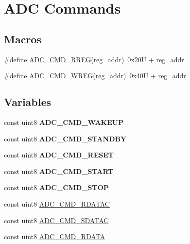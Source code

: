 \hypertarget{group___a_d_c_cmd}{\section{A\-D\-C Commands}
\label{group___a_d_c_cmd}
}
\subsection*{Macros}
\begin{DoxyCompactItemize}
\item 
\#define \hyperlink{group___a_d_c_cmd_ga22bf5b3b8df5ad852238e8f065d66b0f}{A\-D\-C\-\_\-\-C\-M\-D\-\_\-\-R\-R\-E\-G}(reg\-\_\-addr)~0x20\-U + reg\-\_\-addr
\item 
\#define \hyperlink{group___a_d_c_cmd_ga8d377152409009c1afc2e4b815424156}{A\-D\-C\-\_\-\-C\-M\-D\-\_\-\-W\-R\-E\-G}(reg\-\_\-addr)~0x40\-U + reg\-\_\-addr
\end{DoxyCompactItemize}
\subsection*{Variables}
\begin{DoxyCompactItemize}
\item 
\hypertarget{group___a_d_c_cmd_gac9b3fb20159f0583762fff225db8b916}{const uint8 {\bfseries A\-D\-C\-\_\-\-C\-M\-D\-\_\-\-W\-A\-K\-E\-U\-P}}\label{group___a_d_c_cmd_gac9b3fb20159f0583762fff225db8b916}

\item 
\hypertarget{group___a_d_c_cmd_gab9f4c16b230884cb4594b116afed818b}{const uint8 {\bfseries A\-D\-C\-\_\-\-C\-M\-D\-\_\-\-S\-T\-A\-N\-D\-B\-Y}}\label{group___a_d_c_cmd_gab9f4c16b230884cb4594b116afed818b}

\item 
\hypertarget{group___a_d_c_cmd_gaedc128cec4bde7087a0b8e35478072e4}{const uint8 {\bfseries A\-D\-C\-\_\-\-C\-M\-D\-\_\-\-R\-E\-S\-E\-T}}\label{group___a_d_c_cmd_gaedc128cec4bde7087a0b8e35478072e4}

\item 
\hypertarget{group___a_d_c_cmd_ga37bc1ba5d463ad39a3a469041bfc4b3c}{const uint8 {\bfseries A\-D\-C\-\_\-\-C\-M\-D\-\_\-\-S\-T\-A\-R\-T}}\label{group___a_d_c_cmd_ga37bc1ba5d463ad39a3a469041bfc4b3c}

\item 
\hypertarget{group___a_d_c_cmd_ga1d9560af40683e982882b6d2901a80cd}{const uint8 {\bfseries A\-D\-C\-\_\-\-C\-M\-D\-\_\-\-S\-T\-O\-P}}\label{group___a_d_c_cmd_ga1d9560af40683e982882b6d2901a80cd}

\item 
const uint8 \hyperlink{group___a_d_c_cmd_ga9fcb7b6f5c1e453a7bfc1680d70c5099}{A\-D\-C\-\_\-\-C\-M\-D\-\_\-\-R\-D\-A\-T\-A\-C}
\item 
const uint8 \hyperlink{group___a_d_c_cmd_ga12de16fdf97d0bf3c586f88aef41f352}{A\-D\-C\-\_\-\-C\-M\-D\-\_\-\-S\-D\-A\-T\-A\-C}
\item 
const uint8 \hyperlink{group___a_d_c_cmd_gae4f4b91195dfbbd8a18847be5c380709}{A\-D\-C\-\_\-\-C\-M\-D\-\_\-\-R\-D\-A\-T\-A}
\end{DoxyCompactItemize}


